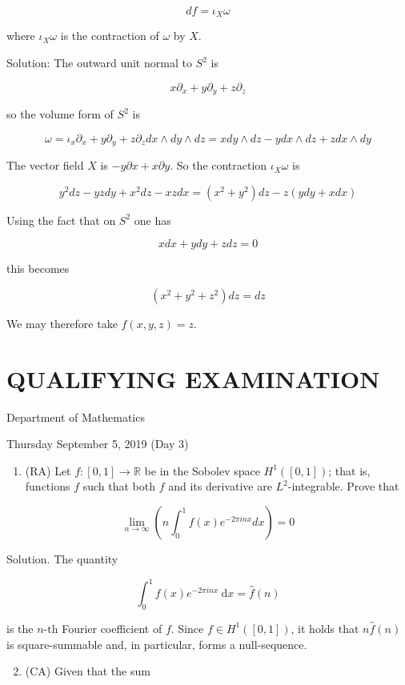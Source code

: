 \documentclass[10pt]{article}
\begin{document}
$$
d f=\iota_{X} \omega
$$

where $\iota_{X} \omega$ is the contraction of $\omega$ by $X$.

Solution: The outward unit normal to $S^{2}$ is

$$
x \partial_{x}+y \partial_{y}+z \partial_{z}
$$

so the volume form of $S^{2}$ is

$$
\omega=\iota_{x} \partial_{x}+y \partial_{y}+z \partial_{z} d x \wedge d y \wedge d z=x d y \wedge d z-y d x \wedge d z+z d x \wedge d y
$$

The vector field $X$ is $-y \partial x+x \partial y$. So the contraction $\iota_{X} \omega$ is

$$
y^{2} d z-y z d y+x^{2} d z-x z d x=\left(x^{2}+y^{2}\right) d z-z(y d y+x d x)
$$

Using the fact that on $S^{2}$ one has

$$
x d x+y d y+z d z=0
$$

this becomes

$$
\left(x^{2}+y^{2}+z^{2}\right) d z=d z
$$

We may therefore take $f(x, y, z)=z$.

\section*{QUALIFYING EXAMINATION }
Department of Mathematics

Thursday September 5, 2019 (Day 3)

\begin{enumerate}
  \item (RA) Let $f:[0,1] \rightarrow \mathbb{R}$ be in the Sobolev space $H^{1}([0,1])$; that is, functions $f$ such that both $f$ and its derivative are $L^{2}$-integrable. Prove that
\end{enumerate}

$$
\lim _{n \rightarrow \infty}\left(n \int_{0}^{1} f(x) e^{-2 \pi i n x} d x\right)=0
$$

Solution. The quantity

$$
\int_{0}^{1} f(x) e^{-2 \pi i n x} \mathrm{~d} x=\hat{f}(n)
$$

is the $n$-th Fourier coefficient of $f$. Since $f \in H^{1}([0,1])$, it holds that $n \hat{f}(n)$ is square-summable and, in particular, forms a null-sequence.

\begin{enumerate}
  \setcounter{enumi}{1}
  \item (CA) Given that the sum
\end{enumerate}
\end{document}
